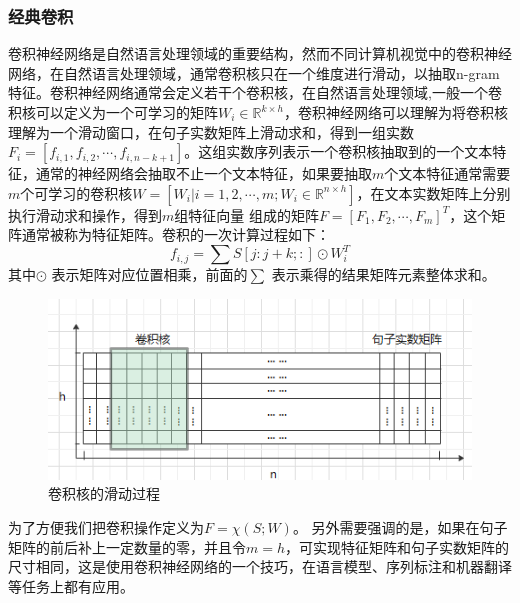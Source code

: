 \documentclass[twoside,a4paper,12pt]{book}%
\begin{document}
\subsubsection{经典卷积}
卷积神经网络是自然语言处理领域的重要结构，然而不同计算机视觉中的卷积神经网络，在自然语言处理领域，通常卷积核只在一个维度进行滑动，以抽取n-gram特征。卷积神经网络通常会定义若干个卷积核，在自然语言处理领域,一般一个卷积核可以定义为一个可学习的矩阵$W_i \in \mathbb{R}^{k \times h}$，卷积神经网络可以理解为将卷积核理解为一个滑动窗口，在句子实数矩阵上滑动求和，得到一组实数$F_i=[f_{i,1},f_{i,2},\cdots,f_{i,n-k+1}]$。这组实数序列表示一个卷积核抽取到的一个文本特征，通常的神经网络会抽取不止一个文本特征，如果要抽取$m$个文本特征通常需要$m$个可学习的卷积核$W=[W_i|i=1,2,\cdots,m;W_i\in \mathbb{R}^{n \times h}]$，在文本实数矩阵上分别执行滑动求和操作，得到$m$组特征向量
组成的矩阵$F=[F_1,F_2,\cdots,F_m]^T$，这个矩阵通常被称为特征矩阵。卷积的一次计算过程如下：
$$
f_{i,j}=\sum{S[j:j+k;:]\odot W_i^T}
$$
其中$\odot$ 表示矩阵对应位置相乘，前面的$\sum$ 表示乘得的结果矩阵元素整体求和。
\begin{figure}[htbp]
\begin{center}
\includegraphics[width=5.0in]{figures/cnn1.png}
\caption{卷积核的滑动过程}
\label{fig:cnn1}
\end{center}
\end{figure}
为了方便我们把卷积操作定义为$F=\mathbb{\chi}(S;W)$。
另外需要强调的是，如果在句子矩阵的前后补上一定数量的零，并且令$m=h$，可实现特征矩阵和句子实数矩阵的尺寸相同，这是使用卷积神经网络的一个技巧，在语言模型、序列标注和机器翻译等任务上都有应用。
\end{document}
